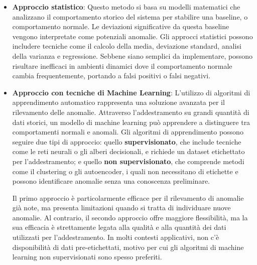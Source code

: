 \begin{itemize}
\item \textbf{Approccio statistico}: Questo metodo si basa su modelli matematici che analizzano il comportamento storico del sistema per stabilire una baseline, o comportamento normale. Le deviazioni significative da questa baseline vengono interpretate come potenziali anomalie. Gli approcci statistici possono includere tecniche come il calcolo della media, deviazione standard, analisi della varianza e regressione. Sebbene siano semplici da implementare, possono risultare inefficaci in ambienti dinamici dove il comportamento normale cambia frequentemente, portando a falsi positivi o falsi negativi.

\item \textbf{Approccio con tecniche di Machine Learning}: L'utilizzo di algoritmi di apprendimento automatico rappresenta una soluzione avanzata per il rilevamento delle anomalie. Attraverso l'addestramento su grandi quantità di dati storici, un modello di machine learning può apprendere a distinguere tra comportamenti normali e anomali. Gli algoritmi di apprendimento possono seguire due tipi di approccio: quello \textbf{supervisionato}, che include tecniche come le reti neurali o gli alberi decisionali, e richiede un dataset etichettato per l'addestramento; e quello \textbf{non supervisionato}, che comprende metodi come il clustering o gli autoencoder, i quali non necessitano di etichette e possono identificare anomalie senza una conoscenza preliminare.

Il primo approccio è particolarmente efficace per il rilevamento di anomalie già note, ma presenta limitazioni quando si tratta di individuare nuove anomalie. Al contrario, il secondo approccio offre maggiore flessibilità, ma la sua efficacia è strettamente legata alla qualità e alla quantità dei dati utilizzati per l'addestramento. In molti contesti applicativi, non c'è disponibilità di dati pre-etichettati, motivo per cui gli algoritmi di machine learning non supervisionati sono spesso preferiti.


\end{itemize}
